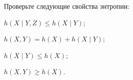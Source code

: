 Проверьте следующие свойства энтропии:
\begin{enumcyr}
    \item $h(X \mid Y, Z) \le h(X \mid Y)$;
    \item $h(X, Y) = h(X) + h(X \mid Y)$;
    \item $h(X \mid Y) \le h(X)$;
    \item $h(X, Y) \ge h(X)$.
\end{enumcyr}
